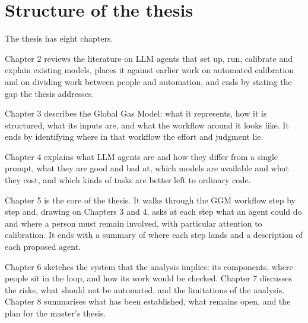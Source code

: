 \section{Structure of the thesis}

The thesis has eight chapters.

Chapter 2 reviews the literature on LLM agents that set up, run, calibrate and explain existing models, places it against earlier work on automated calibration and on dividing work between people and automation, and ends by stating the gap the thesis addresses.

Chapter 3 describes the Global Gas Model: what it represents, how it is structured, what its inputs are, and what the workflow around it looks like.
It ends by identifying where in that workflow the effort and judgment lie.

Chapter 4 explains what LLM agents are and how they differ from a single prompt, what they are good and bad at, which models are available and what they cost, and which kinds of tasks are better left to ordinary code.

Chapter 5 is the core of the thesis.
It walks through the GGM workflow step by step and, drawing on Chapters 3 and 4, asks at each step what an agent could do and where a person must remain involved, with particular attention to calibration.
It ends with a summary of where each step lands and a description of each proposed agent.

Chapter 6 sketches the system that the analysis implies: its components, where people sit in the loop, and how its work would be checked.
Chapter 7 discusses the risks, what should not be automated, and the limitations of the analysis.
Chapter 8 summarises what has been established, what remains open, and the plan for the master's thesis.
